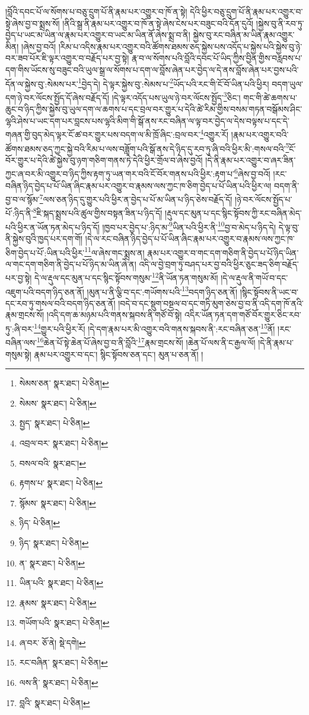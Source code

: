 །བློའི་དབང་པོ་ལ་སོགས་པ་བཅུ་དྲུག་པོ་ནི་རྣམ་པར་འགྱུར་བ་ཁོ་ན་སྟེ། དེའི་ཕྱིར་བཅུ་དྲུག་པོ་ནི་རྣམ་པར་འགྱུར་བ་སྟེ་ཞེས་བྱ་བ་སྨྲས་སོ། །ནིའི་སྒྲ་ནི་རྣམ་པར་འགྱུར་བ་ཁོ་ན་སྟེ་ཞེས་ངེས་པར་བཟུང་བའི་དོན་དུའོ། །སྐྱེས་བུ་ནི་རབ་ཏུ་བྱེད་པ་ཡང་མ་ཡིན་ལ་རྣམ་པར་འགྱུར་བ་ཡང་མ་ཡིན་ནོ་ཞེས་སྨྲ་བ་ནི། སྐྱེས་བུ་རང་བཞིན་མ་ཡིན་རྣམ་འགྱུར་མིན། །ཞེས་བྱ་བའོ། །རིམ་པ་འདིས་རྣམ་པར་འགྱུར་བའི་ཚོགས་ཐམས་ཅད་སྐྱེས་པས་འདོད་པ་སྐྱེས་པའི་སྐྱེས་བུ་ཉེ་བར་ཟབ་པོར་ཇི་ལྟར་འགྱུར་བ་བརྗོད་པར་བྱ་སྟེ། རྣ་བ་ལ་སོགས་པའི་བློའི་དབང་པོ་ཡིད་ཀྱིས་བྱིན་གྱིས་བརླབས་པ་དག་གིས་ཡོངས་སུ་བཟུང་བའི་ཡུལ་སྒྲ་ལ་སོགས་པ་དག་ལ་བློས་ཞེན་པར་བྱེད་ལ་དེ་ནས་བློས་ཞེན་པར་བྱས་པའི་དོན་ལ་སྐྱེས་བུ་:སེམས་པར་\footnote{སེམས་ཅན་  སྣར་ཐང་།  པེ་ཅིན། }བྱེད་དེ། དེ་ལྟར་སྐྱེས་བུ་:སེམས་པ་\footnote{སེམས་  སྣར་ཐང་།  པེ་ཅིན། }ཡོད་པའི་རང་གི་ངོ་བོ་ཡིན་པའི་ཕྱིར། བདག་ཡུལ་དག་ཉེ་བར་ལོངས་སྤྱོད་དོ་ཞེས་བརྗོད་དོ། །དེ་ལྟར་འདོད་པས་ཡུལ་ཉེ་བར་ལོངས་སྤྱོད་\footnote{སྤྱད་  སྣར་ཐང་།  པེ་ཅིན། }ཅིང་། གང་གི་ཚེ་ཆགས་པ་ཆུང་བ་ཉིད་ཀྱིས་སྐྱེས་བུ་ཡུལ་དག་ལ་ཆགས་པ་དང་བྲལ་བར་གྱུར་པ་དེའི་ཚེ་རིམ་གྱིས་བསམ་གཏན་བསྒོམས་ཤིང་ལྷའི་ཤེས་པ་ཡང་དག་པར་བླངས་པས་ལྷའི་མིག་གི་སྒོ་ནས་རང་བཞིན་ལ་ལྟ་བར་བྱེད་ལ་དེས་བལྟས་པ་དང་དེ་གཞན་གྱི་བུད་མེད་ལྟར་ངོ་ཚ་བར་གྱུར་པས་བདག་ལ་མི་ཁྲོ་ཞིང་:བྲལ་བར་\footnote{འབྲལ་བར་  སྣར་ཐང་།  པེ་ཅིན། }འགྱུར་རོ། །རྣམ་པར་འགྱུར་བའི་ཚོགས་ཐམས་ཅད་ཀྱང་སྐྱེ་བའི་རིམ་པ་ལས་བཟློག་པའི་སྒོ་ནས་དེ་ཉིད་དུ་རབ་ཏུ་ཞི་བའི་ཕྱིར་མི་:གསལ་བའི་\footnote{བསལ་བའི་  སྣར་ཐང་། }ངོ་བོར་གྱུར་པ་དེའི་ཚེ་སྐྱེས་བུ་ཉག་གཅིག་གནས་ཏེ་དེའི་ཕྱིར་གྲོལ་བ་ཞེས་བྱའོ། །དེ་ནི་རྣམ་པར་འགྱུར་བ་ཞར་ཟིན་ཀྱང་ཞ་བར་མི་འགྱུར་བ་ཉིད་ཀྱིས་རྟག་ཏུ་ཡན་གར་བའི་ངོ་བོར་གནས་པའི་ཕྱིར་:རྟག་པ་\footnote{རྟགས་པ་  སྣར་ཐང་།  པེ་ཅིན། }ཞེས་བྱ་བའོ། །རང་བཞིན་ཉིད་བྱེད་པ་པོ་ཡིན་ཞིང་རྣམ་པར་འགྱུར་བ་རྣམས་ལས་ཀྱང་ཁ་ཅིག་བྱེད་པ་པོ་ཡིན་པའི་ཕྱིར་ལ། བདག་ནི་བྱ་བ་ལ་སྙོམ་\footnote{སྙོམས་  སྣར་ཐང་།  པེ་ཅིན། }ལས་ཅན་ཉིད་དུ་གྱུར་པའི་ཕྱིར་ན་བྱེད་པ་པོ་མ་ཡིན་པ་ཉིད་ཅེས་བརྗོད་དོ། །ཉེ་བར་ལོངས་སྤྱོད་པ་པོ་:ཉིད་ནི་\footnote{ཉིད་  པེ་ཅིན། }ཇི་སྐད་སྨྲས་པའི་ཚུལ་གྱིས་བསྟན་ཟིན་པ་ཉིད་དོ། །རྡུལ་དང་མུན་པ་དང་སྙིང་སྟོབས་ཀྱི་རང་བཞིན་མེད་པའི་ཕྱིར་ན་ཡོན་ཏན་མེད་པ་ཉིད་དོ། །ཁྱབ་པར་བྱེད་པ་:ཉིད་མ་\footnote{ཉིད་  སྣར་ཐང་།  པེ་ཅིན། }ཡིན་པའི་ཕྱིར་ནི་\footnote{ན་  སྣར་ཐང་།  པེ་ཅིན། }བྱ་བ་མེད་པ་ཉིད་དེ། དེ་ལྟ་བུ་ནི་སྐྱེས་བུའི་ཁྱད་པར་དག་གོ། །དེ་ལ་རང་བཞིན་ཉིད་བྱེད་པ་པོ་ཡིན་ཞིང་རྣམ་པར་འགྱུར་བ་རྣམས་ལས་ཀྱང་ཁ་ཅིག་བྱེད་པ་པོ་:ཡིན་པའི་ཕྱིར་\footnote{ཡིན་པའི་  སྣར་ཐང་།  པེ་ཅིན། }ལ་ཞེས་གང་སྨྲས་ན། རྣམ་པར་འགྱུར་བ་གང་དག་གཅིག་ནི་བྱེད་པ་པོ་ཉིད་ཡིན་ལ་གང་དག་གཅིག་ནི་བྱེད་པ་པོ་ཉིད་མ་ཡིན་ཞེ་ན། འདི་ལ་བྱེ་བྲག་ཏུ་བཤད་པར་བྱ་བའི་ཕྱིར་ཅུང་ཟད་ཅིག་བརྗོད་པར་བྱ་སྟེ། དེ་ལ་རྡུལ་དང་མུན་པ་དང་སྙིང་སྟོབས་གསུམ་\footnote{རྣམས་  སྣར་ཐང་།  པེ་ཅིན། }ནི་ཡོན་ཏན་གསུམ་མོ། །དེ་ལ་རྡུལ་ནི་གཡོ་བ་དང་འཇུག་པའི་བདག་ཉིད་ཅན་ནོ། །མུན་པ་ནི་ལྕི་བ་དང་:གཡོགས་པའི་\footnote{གཡོག་པའི་  སྣར་ཐང་།  པེ་ཅིན། }བདག་ཉིད་ཅན་ནོ། །སྙིང་སྟོབས་ནི་ཡང་བ་དང་རབ་ཏུ་གསལ་བའི་བདག་ཉིད་ཅན་ནོ། །བདེ་བ་དང་སྡུག་བསྔལ་བ་དང་གཏི་མུག་ཅེས་བྱ་བ་ནི་འདི་དག་ཁོ་ནའི་རྣམ་གྲངས་སོ། །འདི་དག་ཆ་མཉམ་པའི་གནས་སྐབས་ནི་གཙོ་བོ་སྟེ། འདིར་ཡོན་ཏན་དག་གཙོ་བོར་གྱུར་ཅིང་རབ་ཏུ་:ཞི་བར་\footnote{ཞ་བར་  ཅོ་ནེ།  སྡེ་དགེ། }གྱུར་པའི་ཕྱིར་རོ། །དེ་དག་རྣམ་པར་མི་འགྱུར་བའི་གནས་སྐབས་ནི་:རང་བཞིན་ཅན་\footnote{རང་བཞིན་  སྣར་ཐང་།  པེ་ཅིན། }ནོ། །རང་བཞིན་ལས་\footnote{ལས་ནི་  སྣར་ཐང་།  པེ་ཅིན། }ཆེན་པོ་སྟེ་ཆེན་པོ་ཞེས་བྱ་བ་ནི་བློའི་\footnote{བླའི་  སྣར་ཐང་།  པེ་ཅིན། }རྣམ་གྲངས་སོ། །ཆེན་པོ་ལས་ནི་ང་རྒྱལ་ལོ། །དེ་ནི་རྣམ་པ་གསུམ་སྟེ། རྣམ་པར་འགྱུར་བ་དང་། སྙིང་སྟོབས་ཅན་དང་། མུན་པ་ཅན་ནོ། །
